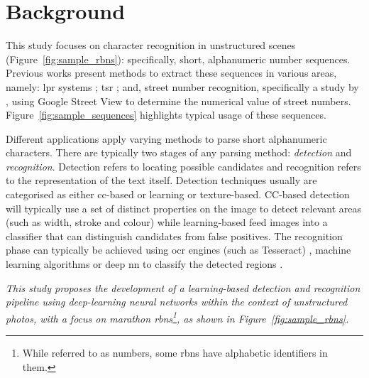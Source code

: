 \section{Background}
\label{sec:introduction:background}

This study focuses on character recognition in unstructured scenes (Figure~\ref{fig:sample_rbns}): specifically, short, alphanumeric number sequences. Previous works present methods to extract these sequences in various areas, namely: \gls{lpr} systems \citep{CanoPerez:2003fq,Anagnostopoulos:2006wv}; \gls{tsr} \citep{Eichner:2008dw,Kundu:2015vq,Seo:2015ez, Lian:2016dc}; and, street number recognition, specifically a study by \citet{Netzer:2011to}, using Google Street View to determine the numerical value of street numbers. Figure~\ref{fig:sample_sequences} highlights typical usage of these sequences.

Different applications apply varying methods to parse short alphanumeric characters. There are typically two stages of any parsing method: \textit{detection} and \textit{recognition}. Detection refers to locating possible candidates and recognition refers to the representation of the text itself. Detection techniques usually are categorised as either \gls{cc}-based or learning or texture-based. CC-based detection will typically use a set of distinct properties on the image to detect relevant areas (such as width, stroke and colour) while learning-based feed images into a classifier that can distinguish candidates from false positives. The recognition phase can typically be achieved using \gls{ocr} engines (such as Tesseract) \citep{Benami:2012jf}, machine learning algorithms \citep{Kundu:2015vq, Netzer:2011to, Lee:1994jz} or deep \gls{nn} to classify the detected regions \citep{Sermanet:2011ui, Lian:2016dc, Jin:2014jn}.

{
  \itshape
  This study proposes the development of a learning-based detection and recognition pipeline using deep-learning neural networks within the context of unstructured photos, with a focus on marathon \glspl{rbn}\footnote{While referred to as numbers, some \glspl{rbn} have alphabetic identifiers in them.}, as shown in Figure~\ref{fig:sample_rbns}.
}

